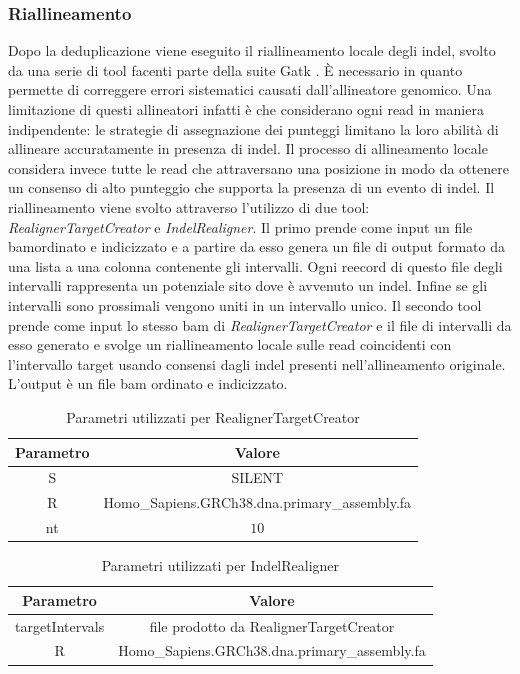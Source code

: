     \subsubsection{Riallineamento}
    Dopo la deduplicazione viene eseguito il riallineamento locale degli indel, svolto da una serie di tool facenti parte della suite Gatk \cite{gatk}.
    \`E necessario in quanto permette di correggere errori sistematici causati dall'allineatore genomico.
    Una limitazione di questi allineatori infatti \`e che considerano ogni read in maniera indipendente: le strategie di assegnazione dei punteggi limitano la loro abilit\`a di allineare accuratamente in presenza di indel.
    Il processo di allineamento locale considera invece tutte le read che attraversano una posizione in modo da ottenere un consenso di alto punteggio che supporta la presenza di un evento di indel.
    Il riallineamento viene svolto attraverso l'utilizzo di due tool: \emph{RealignerTargetCreator} e \emph{IndelRealigner}.
    Il primo prende come input un file bamordinato e indicizzato e a partire da esso genera un file di output formato da una lista a una colonna contenente gli intervalli.
    Ogni reecord di questo file degli intervalli rappresenta un potenziale sito dove \`e avvenuto un indel.
    Infine se gli intervalli sono prossimali vengono uniti in un intervallo unico.
    Il secondo tool prende come input lo stesso bam di \emph{RealignerTargetCreator} e il file di intervalli da esso generato e svolge un riallineamento locale sulle read coincidenti con l'intervallo target usando consensi dagli indel presenti nell'allineamento originale.
    L'output \`e un file bam ordinato e indicizzato.
    \begin{table}[H]
        \centering
        \begin{tabular}{|c|c|}
                \hline
                Parametro & Valore\\
                \hline
                S & SILENT\\
                \hline
                R & Homo\_Sapiens.GRCh38.dna.primary\_assembly.fa\\
                \hline
                nt & $10$\\
                \hline
         \end{tabular}
         \caption{Parametri utilizzati per RealignerTargetCreator}
    \end{table}

    \begin{table}[H]
        \centering
        \begin{tabular}{|c|c|}
                \hline
                Parametro & Valore\\
                \hline
                targetIntervals & file prodotto da RealignerTargetCreator\\
                \hline
                R & Homo\_Sapiens.GRCh38.dna.primary\_assembly.fa\\
                \hline
         \end{tabular}
         \caption{Parametri utilizzati per IndelRealigner}
    \end{table}
